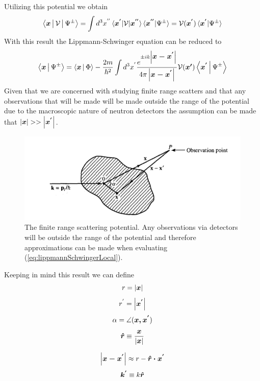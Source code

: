 Utilizing this potential we obtain 
\begin{equation}
\label{eq:localPotentialResult}
\Braket{\mbox{\boldmath$x$}|\mathcal{V}|\Psi^{\pm}}=\int d^3x^{''} \braket{\mbox{\boldmath$x^{'}$}|\mathcal{V}|\mbox{\boldmath$x^{''}$}} \braket{\mbox{\boldmath$x^{''}$}|\Psi^{\pm}}=\mathcal{V}(\mbox{\boldmath$x^{'}$})\braket{\mbox{\boldmath$x^{'}$}|\Psi^{\pm}}
\end{equation}
With this result the Lippmann-Schwinger equation can be reduced to 
\begin{equation}
\label{eq:lippmannSchwingerLocal}
 \Braket{\mbox{\boldmath$x$}|\Psi^{\pm}}=\Braket{\mbox{\boldmath$x$}|\Phi} -\frac{2m}{\hbar^2} \int d^3x^{'} \frac{e^{\pm ik\left|\mbox{\boldmath$x-x^{'}$}\right|}}{ 4\pi \left| \mbox{\boldmath$x-x^{'}$} \right|} \mathcal{V}(\mbox{\boldmath$x{'}$})\Braket{\mbox{\boldmath$x^{'}$}|\Psi^{\pm}}
\end{equation}
Given that we are concerned with studying finite range scatters and that any observations that will be made will be made outside the range of the potential due to the macroscopic nature of neutron detectors the assumption can be made that $\left|\mbox{\boldmath$x$}\right| >>\left|\mbox{\boldmath$x^{'}$}\right|$. 
\begin{figure}[ht!]
\centering
\includegraphics[scale=0.5]{Figures/scatteringObservation.png}
\caption{The finite range scattering potential. Any observations via detectors will be outside the range of the potential and therefore approximations can be made when evaluating (\ref{eq:lippmannSchwingerLocal}).}
\label{fig:finiteRangePotential}
\end{figure}

Keeping in mind this result we can define \cite{sakurai}
$$ r = \left| \mbox{\boldmath$x$} \right| $$
$$r^{'}=\left|\mbox{\boldmath$x^{'}$}\right|$$
$$\alpha = \angle(\mbox{\boldmath$x,x^{'}$})$$
$$\mbox{\boldmath$\hat{r}$} \equiv \frac{\mbox{\boldmath$x$}}{\left|\mbox{\boldmath$x$}\right|}$$

\begin{equation}
\label{eq:toObservation}
\left|\mbox{\boldmath$x-x^{'}$}\right| \approx r-\mbox{\boldmath$\hat{r}\cdot x^{'}$}
\end{equation}
\begin{equation}
\label{eq:propogationVector}
\mbox{\boldmath$k^{'}$} \equiv k\mbox{\boldmath$\hat{r}$}
\end{equation}

